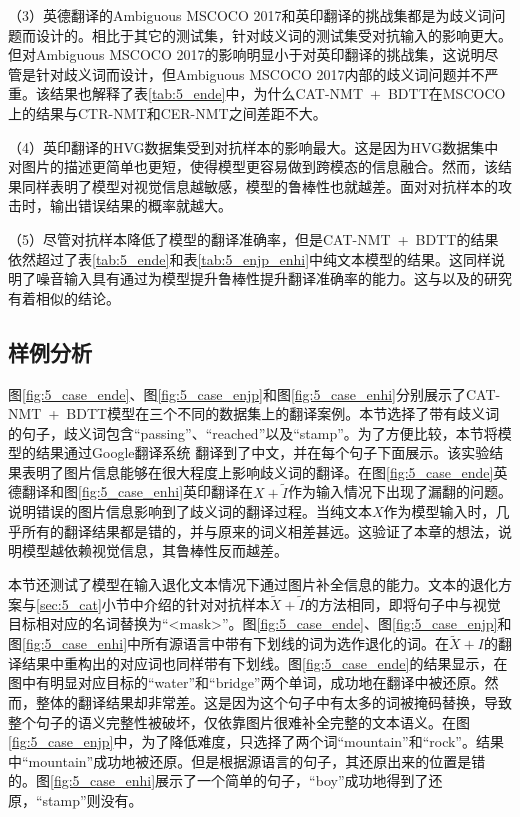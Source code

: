 （3）英德翻译的Ambiguous MSCOCO 2017和英印翻译的挑战集都是为歧义词问题而设计的。相比于其它的测试集，针对歧义词的测试集受对抗输入的影响更大。但对Ambiguous MSCOCO 2017的影响明显小于对英印翻译的挑战集，这说明尽管是针对歧义词而设计，但Ambiguous MSCOCO 2017内部的歧义词问题并不严重。该结果也解释了表\ref{tab:5_ende}中，为什么CAT-NMT~+~BDTT在MSCOCO上的结果与CTR-NMT和CER-NMT之间差距不大。

（4）英印翻译的HVG数据集受到对抗样本的影响最大。这是因为HVG数据集中对图片的描述更简单也更短，使得模型更容易做到跨模态的信息融合。然而，该结果同样表明了模型对视觉信息越敏感，模型的鲁棒性也就越差。面对对抗样本的攻击时，输出错误结果的概率就越大。

（5）尽管对抗样本降低了模型的翻译准确率，但是CAT-NMT~+~BDTT的结果依然超过了表\ref{tab:5_ende}和表\ref{tab:5_enjp_enhi}中纯文本模型的结果。这同样说明了噪音输入具有通过为模型提升鲁棒性提升翻译准确率的能力。这与以及的研究有着相似的结论。


\subsection{样例分析}




图\ref{fig:5_case_ende}、图\ref{fig:5_case_enjp}和图\ref{fig:5_case_enhi}分别展示了CAT-NMT~+~BDTT模型在三个不同的数据集上的翻译案例。本节选择了带有歧义词的句子，歧义词包含“passing”、“reached”以及“stamp”。为了方便比较，本节将模型的结果通过Google翻译系统%
翻译到了中文，并在每个句子下面展示。该实验结果表明了图片信息能够在很大程度上影响歧义词的翻译。在图\ref{fig:5_case_ende}英德翻译和图\ref{fig:5_case_enhi}英印翻译在$X+\tilde{I}$作为输入情况下出现了漏翻的问题。说明错误的图片信息影响到了歧义词的翻译过程。当纯文本$X$作为模型输入时，几乎所有的翻译结果都是错的，并与原来的词义相差甚远。这验证了本章的想法，说明模型越依赖视觉信息，其鲁棒性反而越差。

本节还测试了模型在输入退化文本情况下通过图片补全信息的能力。文本的退化方案与\ref{sec:5_cat}小节中介绍的针对对抗样本$\tilde{X}+\tilde{I}$的方法相同，即将句子中与视觉目标相对应的名词替换为“<mask>”。图\ref{fig:5_case_ende}、图\ref{fig:5_case_enjp}和图\ref{fig:5_case_enhi}中所有源语言中带有下划线的词为选作退化的词。在$\tilde{X}+I$的翻译结果中重构出的对应词也同样带有下划线。图\ref{fig:5_case_ende}的结果显示，在图中有明显对应目标的“water”和“bridge”两个单词，成功地在翻译中被还原。然而，整体的翻译结果却非常差。这是因为这个句子中有太多的词被掩码替换，导致整个句子的语义完整性被破坏，仅依靠图片很难补全完整的文本语义。在图\ref{fig:5_case_enjp}中，为了降低难度，只选择了两个词“mountain”和“rock”。结果中“mountain”成功地被还原。但是根据源语言的句子，其还原出来的位置是错的。图\ref{fig:5_case_enhi}展示了一个简单的句子，“boy”成功地得到了还原，“stamp”则没有。

